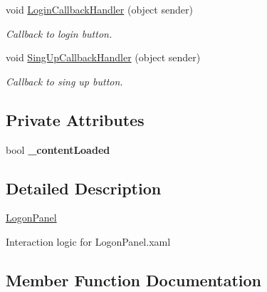 \begin{DoxyCompactItemize}
void \mbox{\hyperlink{class_wpf_handler_1_1_u_i_1_1_controls_1_1_logon_1_1_logon_panel_aa7044f107485654e21dd025a18448160}{Login\+Callback\+Handler}} (object sender)
\begin{DoxyCompactList}\small\item\em Callback to login button. \end{DoxyCompactList}\item 
void \mbox{\hyperlink{class_wpf_handler_1_1_u_i_1_1_controls_1_1_logon_1_1_logon_panel_a58f592ad0e43ccafaa9f872a8bcb4770}{Sing\+Up\+Callback\+Handler}} (object sender)
\begin{DoxyCompactList}\small\item\em Callback to sing up button. \end{DoxyCompactList}\end{DoxyCompactItemize}
\subsection*{Private Attributes}
\begin{DoxyCompactItemize}
\item 
\mbox{\label{class_wpf_handler_1_1_u_i_1_1_controls_1_1_logon_1_1_logon_panel_a09f1ffb4c84fcecf5808e8260d8b1b7b}} 
bool {\bfseries \+\_\+content\+Loaded}
\end{DoxyCompactItemize}


\subsection{Detailed Description}
\mbox{\hyperlink{class_wpf_handler_1_1_u_i_1_1_controls_1_1_logon_1_1_logon_panel}{Logon\+Panel}} 

Interaction logic for Logon\+Panel.\+xaml 

\subsection{Member Function Documentation}
\mbox{\label{class_wpf_handler_1_1_u_i_1_1_controls_1_1_logon_1_1_logon_panel_a1307c96701838404199db630a3cc2ae6}} 
